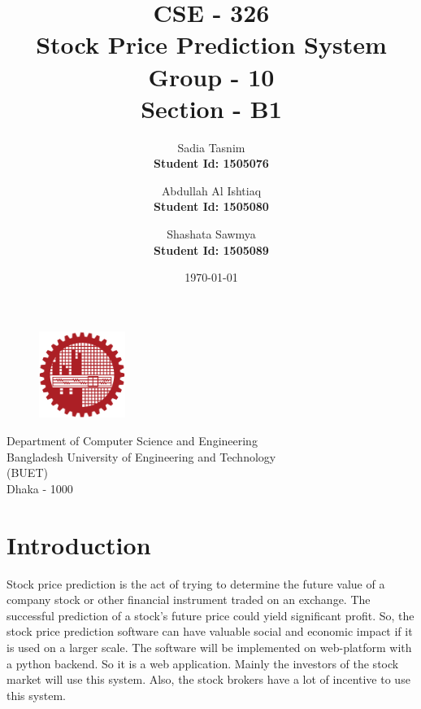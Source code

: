 \documentclass{article}[12pt]
\title{\Huge{CSE - 326} \\\Huge{Stock Price Prediction System} \\\Large{Group - 10} \\ \Large{Section - B1} }
\author{
  Sadia Tasnim\\
  \textbf{Student Id: 1505076}
  \and
  Abdullah Al Ishtiaq\\
  \textbf{Student Id: 1505080}
  \and
  Shashata Sawmya\\
  \textbf{Student Id: 1505089}
}
\date{\today}
\begin{document}
\maketitle

\vspace{3cm}

\begin{figure}[h!]
\centering
    \includegraphics[width = 0.25\textwidth]{Images/logoBUET.png}
\end{figure}
\begin{center}
\vspace{.5cm}

\Large{Department of Computer Science and Engineering \\
    Bangladesh University of Engineering and Technology \\
    (BUET) \\
    Dhaka - 1000 }

\end{center}

\newpage

\tableofcontents
\newpage

\listoffigures
\newpage

\section{Introduction}
Stock price prediction is the act of trying to determine the future value of a company stock or other financial instrument traded on an exchange. The successful prediction of a stock's future price could yield significant profit. So, the stock price prediction software can have valuable social and economic impact if it is used on a larger scale. The software will be implemented on web-platform with a python backend. So it is a web application. Mainly the investors of the stock market will use this system. Also, the stock brokers have a lot of incentive to use this system. 
\end{document}
